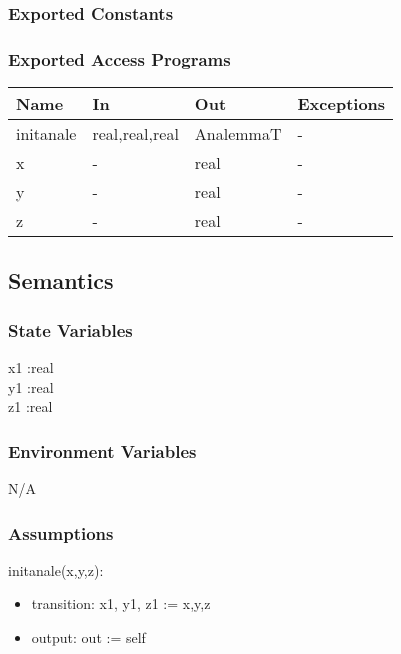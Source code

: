 \documentclass[12pt, titlepage]{article}
\begin{document}
\subsubsection{Exported Constants}


\subsubsection{Exported Access Programs}

\begin{center}
\begin{tabular}{p{2cm} p{4cm} p{4cm} p{2cm}}
\hline
\textbf{Name} & \textbf{In} & \textbf{Out} & \textbf{Exceptions} \\
\hline
initanale&  real,real,real  & AnalemmaT & - \\
x &  -  & real & - \\
y &  -  & real & - \\
z &  -  & real & - \\

\hline
\end{tabular}
\end{center}


\subsection{Semantics}

\subsubsection{State Variables}
x1 :real \\
y1 :real \\
z1 :real \\

\subsubsection{Environment Variables}

N/A\\

\subsubsection{Assumptions}

\noindent  initanale(x,y,z):
\begin{itemize}
\item transition: x1, y1, z1 := x,y,z
\item output: out := self
\end{itemize}
\end{document}
